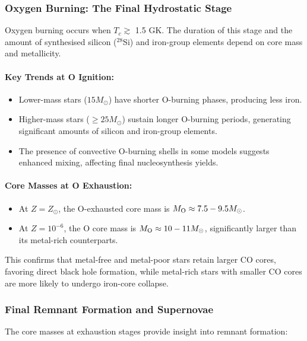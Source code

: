 \subsubsection{Oxygen Burning: The Final Hydrostatic Stage}

Oxygen burning occurs when $T_c \gtrsim$ 1.5 GK. The duration of this stage and the amount of synthesised silicon ($^{28}$Si) and iron-group elements depend on core mass and metallicity.

\paragraph{Key Trends at O Ignition:}
\begin{itemize}
    \item Lower-mass stars ($15 M_\odot$) have shorter O-burning phases, producing less iron.
    \item Higher-mass stars ($\geq 25 M_\odot$) sustain longer O-burning periods, generating significant amounts of silicon and iron-group elements.
    \item The presence of convective O-burning shells in some models suggests enhanced mixing, affecting final nucleosynthesis yields.
\end{itemize}

\paragraph{Core Masses at O Exhaustion:}
\begin{itemize}
    \item At $Z = Z_\odot$, the O-exhausted core mass is $M_{\rm O} \approx 7.5-9.5 M_\odot$.
    \item At $Z = 10^{-6}$, the O core mass is $M_{\rm O} \approx 10-11 M_\odot$, significantly larger than its metal-rich counterparts.
\end{itemize}

This confirms that metal-free and metal-poor stars retain larger CO cores, favoring direct black hole formation, while metal-rich stars with smaller CO cores are more likely to undergo iron-core collapse.

\subsubsection{Final Remnant Formation and Supernovae}

The core masses at exhaustion stages provide insight into remnant formation:

